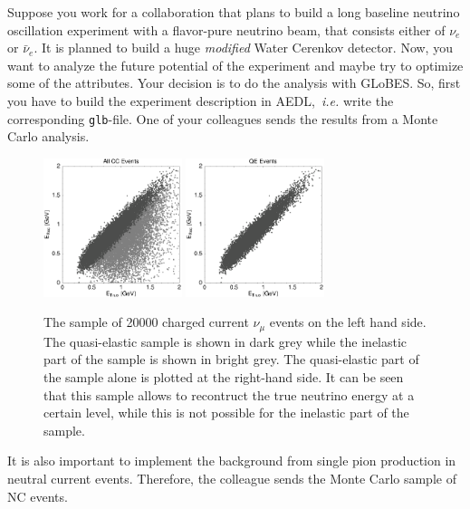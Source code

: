 \documentclass[12pt,a4paper]{article}
\theoremstyle{dotless}
\begin{document}
Suppose you work for a collaboration that plans to build a long baseline 
neutrino oscillation experiment with a flavor-pure neutrino beam, that consists 
either of $\nu_e$ or $\bar{\nu}_e$. It is planned to build a huge {\em modified} 
Water Cerenkov detector. Now, you want to analyze the future potential of the 
experiment and maybe try to optimize some of the attributes. Your decision is to
do the analysis with GLoBES. So, first you have to build the experiment description
in AEDL,~{\it i.e.} write the corresponding {\tt glb}-file. One of your colleagues
sends the results from a Monte Carlo analysis. 
\begin{figure}[h!]
  \begin{center}
    \includegraphics[width=0.36\textwidth]{CCevents.eps} \hspace{0.5cm}
    \includegraphics[width=0.36\textwidth]{QEevents.eps}
  \end{center}
  \vspace{-0.7 cm}
  \caption{\small The sample of 20000 charged current $\nu_\mu$ events on the left hand side. The
  quasi-elastic sample is shown in dark grey while the inelastic part of the sample is
  shown in bright grey. The quasi-elastic part of the sample alone is plotted at the right-hand
  side. It can be seen that this sample allows to recontruct the true neutrino energy at a
  certain level, while this is not possible for the inelastic part of the sample.}
  \label{fig:mccc}
\end{figure}

It is also important to implement the background from single pion production in 
neutral current events. Therefore, the colleague sends the Monte Carlo sample of NC events.
\end{document}
